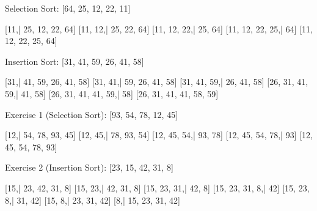 Selection Sort:
[64, 25, 12, 22, 11]

[11,| 25, 12, 22, 64]
[11, 12,| 25, 22, 64]
[11, 12, 22,| 25, 64]
[11, 12, 22, 25,| 64]
[11, 12, 22, 25, 64]

Insertion Sort:
[31, 41, 59, 26, 41, 58]

[31,| 41, 59, 26, 41, 58]
[31, 41,| 59, 26, 41, 58]
[31, 41, 59,| 26, 41, 58]
[26, 31, 41, 59,| 41, 58]
[26, 31, 41, 41, 59,| 58]
[26, 31, 41, 41, 58, 59]

Exercise 1 (Selection Sort):
[93, 54, 78, 12, 45]

[12,| 54, 78, 93, 45]
[12, 45,| 78, 93, 54]
[12, 45, 54,| 93, 78]
[12, 45, 54, 78,| 93]
[12, 45, 54, 78, 93]

Exercise 2 (Insertion Sort):
[23, 15, 42, 31, 8]

[15,| 23, 42, 31, 8]
[15, 23,| 42, 31, 8]
[15, 23, 31,| 42, 8]
[15, 23, 31, 8,| 42]
[15, 23, 8,| 31, 42]
[15, 8,| 23, 31, 42]
[8,| 15, 23, 31, 42]